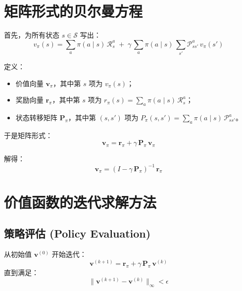 \documentclass[a4paper]{article}
\begin{document}
\hrulefill

\section{矩阵形式的贝尔曼方程}

首先，为所有状态 $s \in \mathcal{S}$ 写出：
\begin{equation*}
v_\pi(s) = \sum_a \pi(a \mid s)\,\mathcal{R}_s^a \;+\;\gamma\,\sum_a \pi(a \mid s)\,\sum_{s'}\mathcal{P}_{ss'}^a\,v_\pi(s')
\end{equation*}

定义：
\begin{itemize}
    \item 价值向量 $\mathbf{v}_\pi$，其中第 $s$ 项为 $v_\pi(s)$；
    \item 奖励向量 $\mathbf{r}_\pi$，其中第 $s$ 项为 $r_\pi(s)=\sum_a\pi(a\mid s)\,\mathcal{R}_s^a$；
    \item 状态转移矩阵 $\mathbf{P}_\pi$，其中第 $(s,s')$ 项为 $P_\pi(s,s')=\sum_a\pi(a\mid s)\,\mathcal{P}_{ss'}^a$。
\end{itemize}

于是矩阵形式：
\begin{equation*}
\mathbf{v}_\pi = \mathbf{r}_\pi + \gamma\,\mathbf{P}_\pi\,\mathbf{v}_\pi
\end{equation*}

解得：
\begin{equation*}
\mathbf{v}_\pi = (I - \gamma\,\mathbf{P}_\pi)^{-1}\,\mathbf{r}_\pi
\end{equation*}

\hrulefill

\section{价值函数的迭代求解方法}

\subsection{策略评估 (Policy Evaluation)}
从初始值 $\mathbf{v}^{(0)}$ 开始迭代：
\begin{equation*}
\mathbf{v}^{(k+1)} = \mathbf{r}_\pi + \gamma\,\mathbf{P}_\pi\,\mathbf{v}^{(k)}
\end{equation*}
直到满足：
\begin{equation*}
\|\mathbf{v}^{(k+1)} - \mathbf{v}^{(k)}\|_\infty < \epsilon
\end{equation*}
\end{document}
